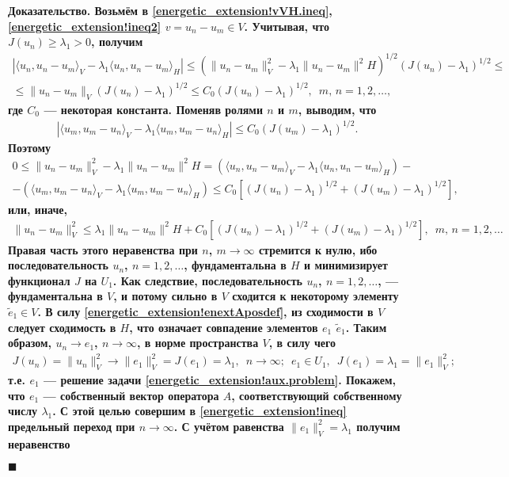 \documentclass{report}
\newcounter{lem}[section]
\newenvironment{Proof}{\par\noindent\bf Доказательство.\rm}{ $\blacksquare$\par}
\begin{document}
\begin{Proof}
Возьмём в \eqref{energetic_extension!vVH.ineq}, \eqref{energetic_extension!ineq2} $v=u_n-u_m\in V$. Учитывая, что $J(u_n)\geqslant\lambda_1>0$, получим
\begin{gather*}
|\langle u_n,u_n-u_m\rangle_V-\lambda_1\langle u_n,u_n-u_m\rangle_H|\leqslant(\|u_n-u_m\|^2_V-\lambda_1\|u_n-u_m\|^2H)^{1/2}(J(u_n)-\lambda_1)^{1/2}\leqslant\\
\leqslant\|u_n-u_m\|_V(J(u_n)-\lambda_1)^{1/2}\leqslant C_0(J(u_n)-\lambda_1)^{1/2},\,\,\,m,\,n=1,2,\dots,
\end{gather*}
где $C_0$ --- некоторая константа. Поменяв ролями $n$ и $m$, выводим, что
\begin{gather*}
|\langle u_m,u_m-u_n\rangle_V-\lambda_1\langle u_m,u_m-u_n\rangle_H|\leqslant C_0(J(u_m)-\lambda_1)^{1/2}.
\end{gather*}
Поэтому
\begin{gather*}
0\leqslant\|u_n-u_m\|^2_V-\lambda_1\|u_n-u_m\|^2H=(\langle u_n,u_n-u_m\rangle_V-\lambda_1\langle u_n,u_n-u_m\rangle_H)-\\
-(\langle u_m,u_m-u_n\rangle_V-\lambda_1\langle u_m,u_m-u_n\rangle_H)\leqslant C_0[(J(u_n)-\lambda_1)^{1/2}+(J(u_m)-\lambda_1)^{1/2}],
\end{gather*}
или, иначе,
\begin{gather*}
\|u_n-u_m\|^2_V\leqslant\lambda_1\|u_n-u_m\|^2H+C_0[(J(u_n)-\lambda_1)^{1/2}+(J(u_m)-\lambda_1)^{1/2}],\,\,\,m,\,n=1,2,\dots
\end{gather*}
Правая часть этого неравенства при $n$, $m\to\infty$ стремится к нулю, ибо последовательность $u_n$, $n=1,2,\dots$, фундаментальна в $H$ и минимизирует функционал $J$ на $U_1$. Как
следствие, последовательность $u_n$, $n=1,2,\dots$, --- фундаментальна в $V$, и потому сильно в $V$ сходится к некоторому элементу $\tilde{e}_1\in V$. В силу
\eqref{energetic_extension!enextAposdef}, из сходимости в $V$ следует сходимость в $H$, что означает совпадение элементов $e_1$ $\tilde{e}_1$. Таким образом, $u_n\to e_1$, $n\to\infty$,
в норме пространства $V$, в силу чего
\begin{gather*}
J(u_n)=\|u_n\|^2_V\to\|e_1\|_V^2=J(e_1)=\lambda_1,\,\,\,n\to\infty;\,\,\,e_1\in U_1,\,\,\,J(e_1)=\lambda_1=\|e_1\|_V^2;
\end{gather*}
т.е. $e_1$ --- решение задачи \eqref{energetic_extension!aux.problem}. Покажем, что $e_1$ --- собственный вектор оператора $A$, соответствующий собственному числу $\lambda_1$. С этой целью
совершим в \eqref{energetic_extension!ineq} предельный переход при $n\to\infty$. С учётом равенства $\|e_1\|^2_V=\lambda_1$ получим неравенство

\end{Proof}
\end{document}

